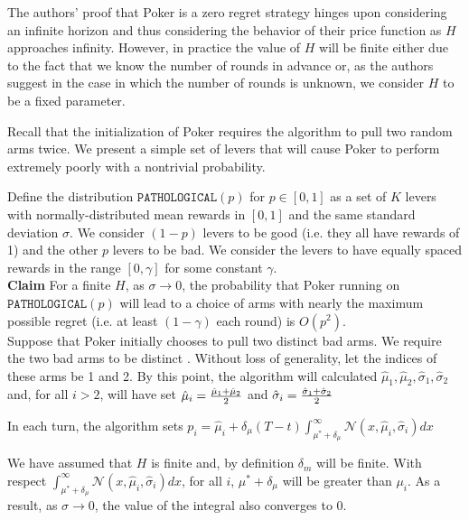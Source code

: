 \documentclass[12pt]{article}
\begin{document}
The authors' proof that Poker is a zero regret strategy hinges upon considering an infinite horizon and thus considering the behavior of their price function as $H$ approaches infinity. However, in practice the value of $H$ will be finite either due to the fact that we know the number of rounds in advance or, as the authors suggest in the case in which the number of rounds is unknown, we consider $H$ to be a fixed parameter.

Recall that the initialization of Poker requires the algorithm to pull two random arms twice. We present a simple set of levers that will cause Poker to perform extremely poorly with a nontrivial probability.

Define the distribution $\texttt{PATHOLOGICAL}(p)$ for $p \in [0,1]$ as a set of $K$ levers with normally-distributed mean rewards in $[0,1]$ and the same standard deviation $\sigma$. We consider $(1-p)$ levers to be good (i.e. they all have rewards of 1) and the other $p$ levers to be bad. We consider the levers to have equally spaced rewards in the range $[0,\gamma]$ for some constant $\gamma$. \\

\noindent
\textbf{Claim} For a finite $H$, as $\sigma \rightarrow 0$, the probability that Poker running on $\texttt{PATHOLOGICAL}(p)$ will lead to a choice of arms with nearly the maximum possible regret (i.e. at least $(1-\gamma)$ each round) is $O(p^{2})$. \\ 

Suppose that Poker initially chooses to pull two distinct bad arms. We require the two bad arms to be distinct . Without loss of generality, let the indices of these arms be 1 and 2. By this point, the algorithm will calculated $\hat{\mu}_{1}, \hat{\mu}_{2}, \hat{\sigma}_{1},\hat{\sigma}_{2}$ and, for all $i > 2$, will have set $\hat{\mu}_{i}= {\hat{\mu}_{1}+\hat{\mu}_{2}\over 2}$ and $\hat{\sigma}_{i} = {\hat{\sigma}_{1}+\hat{\sigma}_{2}\over 2}$

In each turn, the algorithm sets $p_{i} = \hat{\mu}_{i} + \delta_{\mu}(T-t)\int_{\mu^{*}+\delta_{\mu}}^{\infty}\mathcal{N}(x,\hat{\mu}_{i}, \hat{\sigma}_{i})dx$

We have assumed that $H$ is finite and, by definition $\delta_{m}$ will be finite. With respect $\int_{\mu^{*}+\delta_{\mu}}^{\infty}\mathcal{N}(x,\hat{\mu}_{i}, \hat{\sigma}_{i})dx$, for all $i$, $\mu^{*}+\delta_{\mu}$ will be greater than $\mu_{i}$. As a result, as $\sigma \to 0$, the value of the integral also converges to 0.
\end{document}
